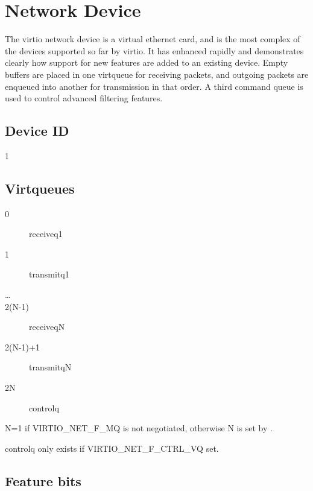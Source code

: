 \section{Network Device}\label{sec:Device Types / Network Device}

The virtio network device is a virtual ethernet card, and is the
most complex of the devices supported so far by virtio. It has
enhanced rapidly and demonstrates clearly how support for new
features are added to an existing device. Empty buffers are
placed in one virtqueue for receiving packets, and outgoing
packets are enqueued into another for transmission in that order.
A third command queue is used to control advanced filtering
features.

\subsection{Device ID}\label{sec:Device Types / Network Device / Device ID}

 1

\subsection{Virtqueues}\label{sec:Device Types / Network Device / Virtqueues}

\begin{description}
\item[0] receiveq1
\item[1] transmitq1
\item[\ldots]
\item[2(N-1)] receiveqN
\item[2(N-1)+1] transmitqN
\item[2N] controlq
\end{description}

 N=1 if VIRTIO_NET_F_MQ is not negotiated, otherwise N is set by
 .

 controlq only exists if VIRTIO_NET_F_CTRL_VQ set.

\subsection{Feature bits}\label{sec:Device Types / Network Device / Feature bits}

